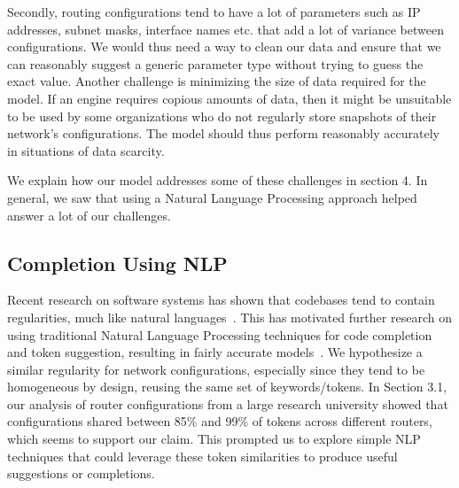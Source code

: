 Secondly, routing configurations tend to have a lot of parameters such as IP addresses, subnet masks, interface names etc. that add a lot of variance between configurations. We would thus need a way to clean our data and ensure that we can reasonably suggest a generic parameter type without trying to guess the exact value. Another challenge is minimizing the size of data required for the model. If an engine requires copious amounts of data, then it might be unsuitable to be used by some organizations who do not regularly store snapshots of their network's configurations. The model should thus perform reasonably accurately in situations of data scarcity. 

We explain how our model addresses some of these challenges in section 4. In general, we saw that using a Natural Language Processing approach helped answer a lot of our challenges.

\subsection{Completion Using NLP}
Recent research on software systems has shown that codebases tend to contain regularities, much like natural languages~\cite{naturalness}. This has motivated further research on using traditional Natural Language Processing techniques for code completion and token suggestion, resulting in fairly accurate models~\cite{naturalness, raychev}. We hypothesize a similar regularity for network configurations, especially since they tend to be homogeneous by design, reusing the same set of keywords/tokens. In Section 3.1, our analysis of router configurations from a large research university showed that configurations shared between 85\% and 99\% of tokens across different routers, which seems to support our claim. This prompted us to explore simple NLP techniques that could leverage these token similarities to produce useful suggestions or completions.\\

